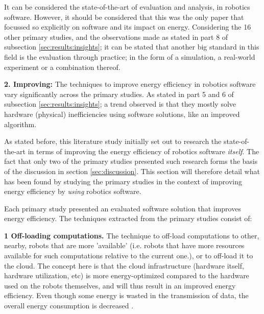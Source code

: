 It can be considered the state-of-the-art of evaluation and analysis, in robotics software.
However, it should be considered that this was the only paper that focussed so explicitly on software and its impact on energy.
Considering the 16 other primary studies, and the observations made as stated in part 8 of subsection \ref{sec:results:insights}; 
it can be stated that another big standard in this field is the evaluation through practice; 
in the form of a simulation, a real-world experiment or a combination thereof.

\vspace{5mm}

\noindent\textbf{2. Improving:}
The techniques to improve energy efficiency in robotics software vary significantly across the primary studies. 
As stated in part 5 and 6 of subsection \ref{sec:results:insights}; a trend observed is that they mostly solve hardware (physical) 
inefficiencies using software solutions, like an improved algorithm.

\vspace{2mm}

As stated before, this literature study initially set out to research the state-of-the-art in terms of improving the
energy efficiency of robotics software \textit{itself}.
The fact that only two of the primary studies presented such research forms the basis of the discussion in section \ref{sec:discussion}. 
This section will therefore detail what has been found by studying the primary studies in the context of improving energy efficiency 
by \textit{using} robotics software.

\vspace{2mm}

Each primary study presented an evaluated software solution that improves energy efficiency.
The techniques extracted from the primary studies consist of:

\vspace{2mm}

\textbf{1 Off-loading computations.} The technique to off-load computations to other, nearby, robots that are more 'available' 
(i.e. robots that have more resources available for such computations relative to the current one.), or to off-load it to the cloud.
The concept here is that the cloud infrastructure (hardware itself, hardware utilization, etc) is more energy-optimized compared to the
hardware used on the robots themselves, and will thus result in an improved energy efficiency.
Even though some energy is wasted in the transmission of data, the overall energy consumption is decreased \cite{rahman2019cloud_robot_offloading}.
    
